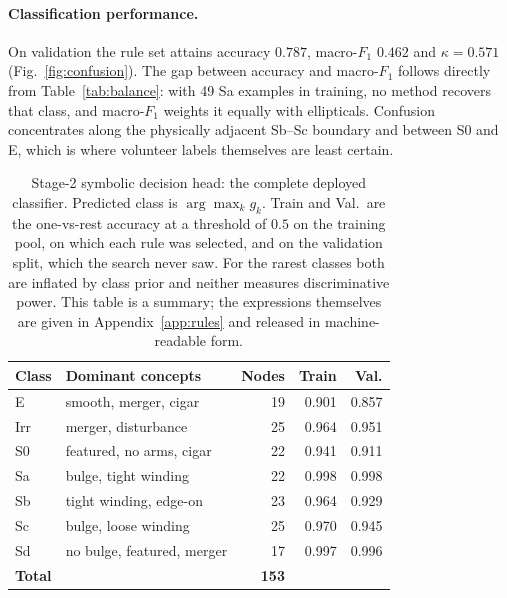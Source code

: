 \documentclass[11pt]{article}
\begin{document}
\paragraph{Classification performance.}
On validation the rule set attains accuracy $0.787$, macro-$F_1$ $0.462$ and
$\kappa = 0.571$ (Fig.~\ref{fig:confusion}). The gap between accuracy and
macro-$F_1$ follows directly from Table~\ref{tab:balance}: with 49 Sa
examples in training, no method recovers that class, and macro-$F_1$ weights
it equally with ellipticals. Confusion concentrates along the physically
adjacent Sb--Sc boundary and between S0 and E, which is where volunteer
labels themselves are least certain.

\begin{table}[htbp]
\centering
\caption{Stage-2 symbolic decision head: the complete deployed classifier.
Predicted class is $\arg\max_k g_k$. Train and Val.\ are the one-vs-rest
accuracy at a threshold of $0.5$ on the training pool, on which each rule was
selected, and on the validation split, which the search never saw. For the
rarest classes both are inflated by class prior and neither measures
discriminative power. This table is a summary; the expressions themselves are
given in Appendix~\ref{app:rules} and released in machine-readable form.}
\label{tab:rules}
\footnotesize
\setlength{\tabcolsep}{4pt}
\begin{tabular}{llrrr}
\toprule
Class & Dominant concepts & Nodes & Train & Val. \\
\midrule
E   & smooth, merger, cigar        & 19 & 0.901 & 0.857 \\
Irr & merger, disturbance          & 25 & 0.964 & 0.951 \\
S0  & featured, no arms, cigar     & 22 & 0.941 & 0.911 \\
Sa  & bulge, tight winding         & 22 & 0.998 & 0.998 \\
Sb  & tight winding, edge-on       & 23 & 0.964 & 0.929 \\
Sc  & bulge, loose winding         & 25 & 0.970 & 0.945 \\
Sd  & no bulge, featured, merger   & 17 & 0.997 & 0.996 \\
\midrule
\textbf{Total} & & \textbf{153} & & \\
\bottomrule
\end{tabular}
\end{table}
\end{document}
